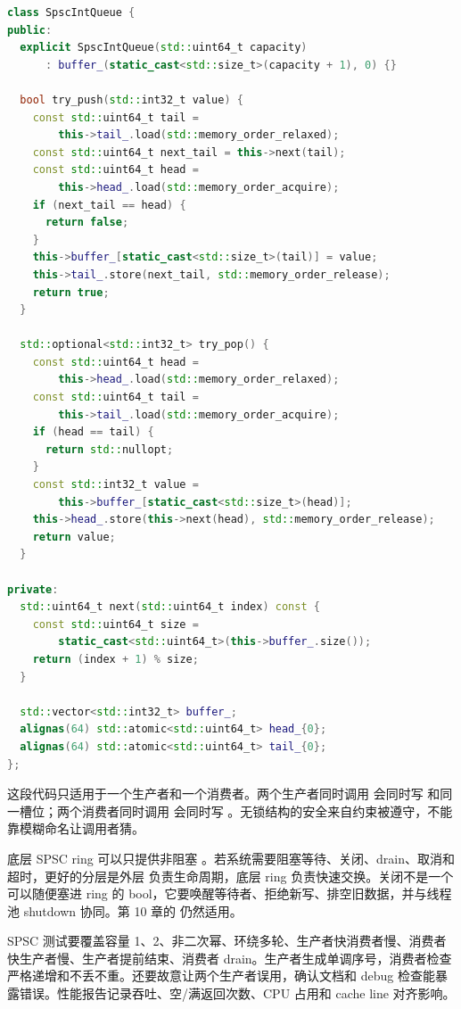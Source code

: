 \begin{lstlisting}[language=C++,caption={SPSC ring buffer 的核心实现}]
class SpscIntQueue {
public:
  explicit SpscIntQueue(std::uint64_t capacity)
      : buffer_(static_cast<std::size_t>(capacity + 1), 0) {}

  bool try_push(std::int32_t value) {
    const std::uint64_t tail =
        this->tail_.load(std::memory_order_relaxed);
    const std::uint64_t next_tail = this->next(tail);
    const std::uint64_t head =
        this->head_.load(std::memory_order_acquire);
    if (next_tail == head) {
      return false;
    }
    this->buffer_[static_cast<std::size_t>(tail)] = value;
    this->tail_.store(next_tail, std::memory_order_release);
    return true;
  }

  std::optional<std::int32_t> try_pop() {
    const std::uint64_t head =
        this->head_.load(std::memory_order_relaxed);
    const std::uint64_t tail =
        this->tail_.load(std::memory_order_acquire);
    if (head == tail) {
      return std::nullopt;
    }
    const std::int32_t value =
        this->buffer_[static_cast<std::size_t>(head)];
    this->head_.store(this->next(head), std::memory_order_release);
    return value;
  }

private:
  std::uint64_t next(std::uint64_t index) const {
    const std::uint64_t size =
        static_cast<std::uint64_t>(this->buffer_.size());
    return (index + 1) % size;
  }

  std::vector<std::int32_t> buffer_;
  alignas(64) std::atomic<std::uint64_t> head_{0};
  alignas(64) std::atomic<std::uint64_t> tail_{0};
};
\end{lstlisting}

这段代码只适用于一个生产者和一个消费者。两个生产者同时调用  会同时写  和同一槽位；两个消费者同时调用  会同时写 。无锁结构的安全来自约束被遵守，不能靠模糊命名让调用者猜。

底层 SPSC ring 可以只提供非阻塞 。若系统需要阻塞等待、关闭、drain、取消和超时，更好的分层是外层  负责生命周期，底层 ring 负责快速交换。关闭不是一个可以随便塞进 ring 的 bool，它要唤醒等待者、拒绝新写、排空旧数据，并与线程池 shutdown 协同。第 10 章的  仍然适用。

SPSC 测试要覆盖容量 1、2、非二次幂、环绕多轮、生产者快消费者慢、消费者快生产者慢、生产者提前结束、消费者 drain。生产者生成单调序号，消费者检查严格递增和不丢不重。还要故意让两个生产者误用，确认文档和 debug 检查能暴露错误。性能报告记录吞吐、空/满返回次数、CPU 占用和 cache line 对齐影响。

